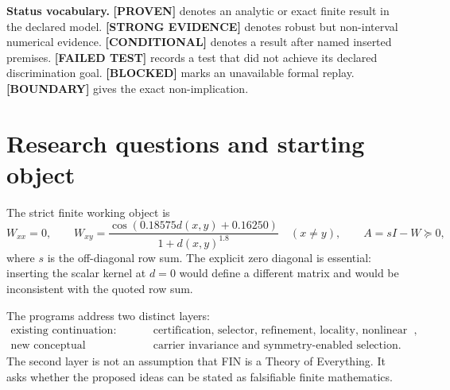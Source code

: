 \documentclass[11pt,a4paper]{article}
\newcommand{\proven}{\textcolor{green!40!black}{\textbf{[PROVEN]}}}
\newcommand{\strong}{\textcolor{blue!70!black}{\textbf{[STRONG EVIDENCE]}}}
\newcommand{\conditional}{\textcolor{black!60}{\textbf{[CONDITIONAL]}}}
\newcommand{\failed}{\textcolor{red!72!black}{\textbf{[FAILED TEST]}}}
\newcommand{\blocked}{\textcolor{red!72!black}{\textbf{[BLOCKED]}}}
\newcommand{\statusboundary}{\textcolor{orange!80!black}{\textbf{[BOUNDARY]}}}
\begin{document}
\begin{abstract}
ST43 separates symmetry from feedback in a constructed $C_{12}$-equivariant polar flow. Symmetry supplies twelve equivalent alternatives; positive linear gain destabilizes the symmetric state, saturation bounds growth, and an equivariant angular term selects an orbit member. ST44 shows that the strict operator itself provides a canonical two-dimensional degenerate subspace but no preferred axis; a selected axis yields only the $74$-dimensional reflection-anchored algebra. ST45 finally proves that unitary and heat channels can share $A$ while remaining dynamically inequivalent on every positive mode. Thus the new hypothesis is mathematically meaningful, but FIN has not shown that distinct physical media instantiate one operational information object, nor that its feedback gain or realized history is generated by the strict core.
\end{abstract}

\textbf{Status vocabulary.} \proven{} denotes an analytic or exact finite result in the declared model. \strong{} denotes robust but non-interval numerical evidence. \conditional{} denotes a result after named inserted premises. \failed{} records a test that did not achieve its declared discrimination goal. \blocked{} marks an unavailable formal replay. \statusboundary{} gives the exact non-implication.

\tableofcontents
\newpage

\section{Research questions and starting object}

The strict finite working object is
\[
W_{xx}=0,\qquad
W_{xy}=\frac{\cos(0.18575d(x,y)+0.16250)}{1+d(x,y)^{1.8}}\quad(x\ne y),
\qquad A=sI-W\succeq0,
\]
where $s$ is the off-diagonal row sum. The explicit zero diagonal is essential: inserting the scalar kernel at $d=0$ would define a different matrix and would be inconsistent with the quoted row sum.

The programs address two distinct layers:
\begin{align*}
\text{existing continuation: }&\quad \text{certification, selector, refinement, locality, nonlinear and scale tests},\\
\text{new conceptual continuation: }&\quad \text{carrier invariance and symmetry-enabled selection}.
\end{align*}
The second layer is not an assumption that FIN is a Theory of Everything. It asks whether the proposed ideas can be stated as falsifiable finite mathematics.
\end{document}
